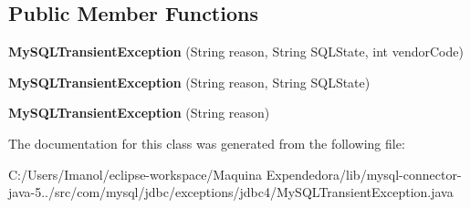 \subsection*{Public Member Functions}
\begin{DoxyCompactItemize}
\item 
\mbox{\label{classcom_1_1mysql_1_1jdbc_1_1exceptions_1_1jdbc4_1_1_my_s_q_l_transient_exception_ac9c098b3f0a1c0eeeb17183676021bc4}} 
{\bfseries My\+S\+Q\+L\+Transient\+Exception} (String reason, String S\+Q\+L\+State, int vendor\+Code)
\item 
\mbox{\label{classcom_1_1mysql_1_1jdbc_1_1exceptions_1_1jdbc4_1_1_my_s_q_l_transient_exception_a291c41f7aa763de28275645d14e92776}} 
{\bfseries My\+S\+Q\+L\+Transient\+Exception} (String reason, String S\+Q\+L\+State)
\item 
\mbox{\label{classcom_1_1mysql_1_1jdbc_1_1exceptions_1_1jdbc4_1_1_my_s_q_l_transient_exception_a0c1f3f8a8224f46dc9cbd155e4224d1e}} 
{\bfseries My\+S\+Q\+L\+Transient\+Exception} (String reason)
\end{DoxyCompactItemize}


The documentation for this class was generated from the following file\+:\begin{DoxyCompactItemize}
\item 
C\+:/\+Users/\+Imanol/eclipse-\/workspace/\+Maquina Expendedora/lib/mysql-\/connector-\/java-\/5../src/com/mysql/jdbc/exceptions/jdbc4/My\+S\+Q\+L\+Transient\+Exception.\+java\end{DoxyCompactItemize}

